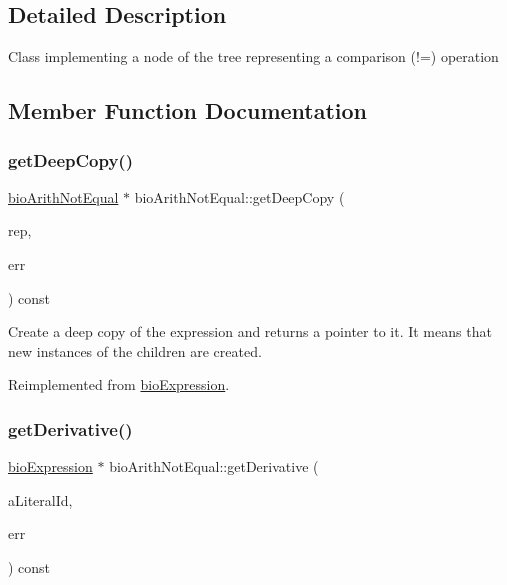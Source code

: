\subsection{Detailed Description}
Class implementing a node of the tree representing a comparison (!=) operation 

\subsection{Member Function Documentation}
\mbox{\label{classbio_arith_not_equal_a6b6319667f2a08c63854edfbd2cae799}} 
\subsubsection{\texorpdfstring{get\+Deep\+Copy()}{getDeepCopy()}}
{\footnotesize\ttfamily \hyperlink{classbio_arith_not_equal}{bio\+Arith\+Not\+Equal} $\ast$ bio\+Arith\+Not\+Equal\+::get\+Deep\+Copy (\begin{DoxyParamCaption}\item[{\hyperlink{classbio_expression_repository}{bio\+Expression\+Repository} $\ast$}]{rep,  }\item[{pat\+Error $\ast$\&}]{err }\end{DoxyParamCaption}) const\hspace{0.3cm}{\ttfamily [virtual]}}

Create a deep copy of the expression and returns a pointer to it. It means that new instances of the children are created. 

Reimplemented from \hyperlink{classbio_expression_a4ee1b8add634078a02eaae26cd40dcc8}{bio\+Expression}.

\mbox{\label{classbio_arith_not_equal_ad06316415449cf1af6657a9932f819e2}} 
\subsubsection{\texorpdfstring{get\+Derivative()}{getDerivative()}}
{\footnotesize\ttfamily \hyperlink{classbio_expression}{bio\+Expression} $\ast$ bio\+Arith\+Not\+Equal\+::get\+Derivative (\begin{DoxyParamCaption}\item[{pat\+U\+Long}]{a\+Literal\+Id,  }\item[{pat\+Error $\ast$\&}]{err }\end{DoxyParamCaption}) const\hspace{0.3cm}{\ttfamily [virtual]}}

